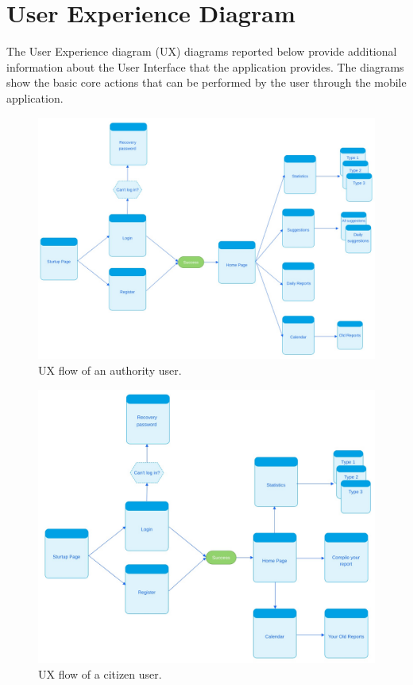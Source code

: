 \documentclass{report}
\begin{document}
\section{User Experience Diagram}
The User Experience diagram (UX) diagrams reported below provide additional information about the User
Interface that the application provides. The diagrams show the basic core actions
that can be performed by the user through the mobile application. 

\begin{figure}[!ht]
	\begin{center}
	\includegraphics[width=\textwidth]{img/AuthoritiesUX.png}
	\end{center}
    \caption{UX flow of an authority user.}
    
\end{figure}\begin{figure}[!ht]
	\begin{center}
	\includegraphics[width=\textwidth]{img/CitizenUX.png}
	\end{center}
	\caption{UX flow of a citizen user.}
\end{figure}
\end{document}
